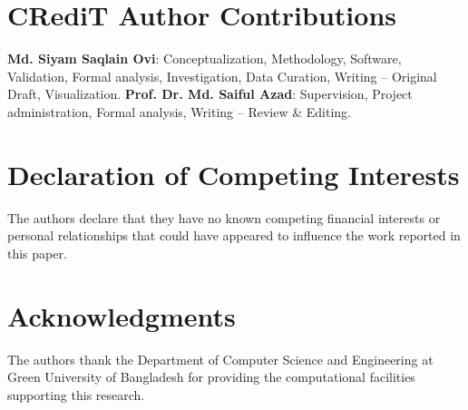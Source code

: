 \documentclass[review]{elsarticle}
\begin{document}
\section*{CRediT Author Contributions}
\textbf{Md. Siyam Saqlain Ovi}: Conceptualization, Methodology, Software, Validation, Formal analysis, Investigation, Data Curation, Writing -- Original Draft, Visualization.
\textbf{Prof. Dr. Md. Saiful Azad}: Supervision, Project administration, Formal analysis, Writing -- Review \& Editing.

\section*{Declaration of Competing Interests}
The authors declare that they have no known competing financial interests or personal relationships that could have appeared to influence the work reported in this paper.

\section*{Acknowledgments}
The authors thank the Department of Computer Science and Engineering at Green University of Bangladesh for providing the computational facilities supporting this research.


\end{document}
